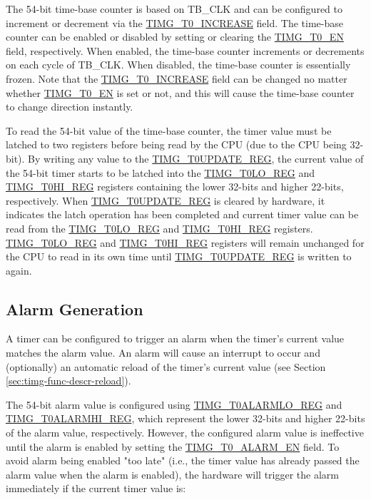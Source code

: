 \documentclass[main\_\_EN.tex]{subfiles}
\begin{document}
The 54-bit time-base counter is based on TB\_CLK and can be configured to increment or decrement via the \hyperref[fielddesc:TIMGTXINCREASE]{TIMG\_T0\_INCREASE} field. The time-base counter can be enabled or disabled by setting or clearing the \hyperref[fielddesc:TIMGTXEN]{TIMG\_T0\_EN} field, respectively. When enabled, the time-base counter increments or decrements on each cycle of TB\_CLK. When disabled, the time-base counter is essentially frozen. Note that the \hyperref[fielddesc:TIMGTXINCREASE]{TIMG\_T0\_INCREASE} field can be changed no matter whether \hyperref[fielddesc:TIMGTXEN]{TIMG\_T0\_EN} is set or not, and this will cause the time-base counter to change direction instantly.

To read the 54-bit value of the time-base counter, the timer value must be latched to two registers before being read by the CPU (due to the CPU being 32-bit). By writing any value to the \hyperref[regdesc:TIMGTXUPDATEREG]{TIMG\_T0UPDATE\_REG}, the current value of the 54-bit timer starts to be latched into the \hyperref[regdesc:TIMGTXLOREG]{TIMG\_T0LO\_REG} and \hyperref[regdesc:TIMGTXHIREG]{TIMG\_T0HI\_REG} registers containing the lower 32-bits and higher 22-bits, respectively. When \hyperref[regdesc:TIMGTXUPDATEREG]{TIMG\_T0UPDATE\_REG} is cleared by hardware, it indicates the latch operation has been completed and current timer value can be read from the \hyperref[regdesc:TIMGTXLOREG]{TIMG\_T0LO\_REG} and \hyperref[regdesc:TIMGTXHIREG]{TIMG\_T0HI\_REG} registers. \hyperref[regdesc:TIMGTXLOREG]{TIMG\_T0LO\_REG} and \hyperref[regdesc:TIMGTXHIREG]{TIMG\_T0HI\_REG} registers will remain unchanged for the CPU to read in its own time until \hyperref[regdesc:TIMGTXUPDATEREG]{TIMG\_T0UPDATE\_REG} is written to again.

\subsection{Alarm Generation}

A timer can be configured to trigger an alarm when the timer's current value matches the alarm value. An alarm will cause an interrupt to occur and (optionally) an automatic reload of the timer's current value (see Section \ref{sec:timg-func-descr-reload}).

The 54-bit alarm value is configured using \hyperref[regdesc:TIMGTXALARMLOREG]{TIMG\_T0ALARMLO\_REG} and \hyperref[regdesc:TIMGTXALARMHIREG]{TIMG\_T0ALARMHI\_REG}, which represent the lower 32-bits and higher 22-bits of the alarm value, respectively. However, the configured alarm value is ineffective until the alarm is enabled by setting the \hyperref[fielddesc:TIMGTXALARMEN]{TIMG\_T0\_ALARM\_EN} field. To avoid alarm being enabled "too late" (i.e., the timer value has already passed the alarm value when the alarm is enabled), the hardware will trigger the alarm immediately if the current timer value is:
\end{document}
